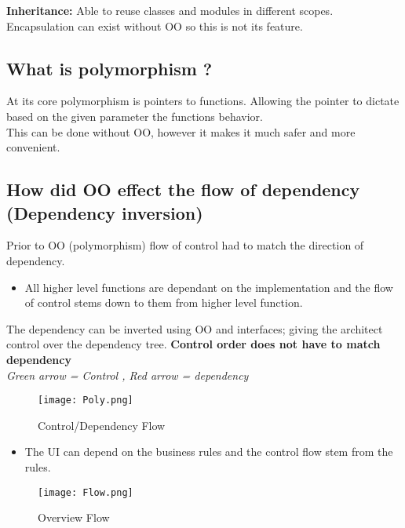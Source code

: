 \documentclass[11pt]{scrartcl} %
\begin{document}
\textbf{Inheritance:} Able to reuse classes and modules in different
scopes.\\

Encapsulation can exist without OO so this is not its feature.

\subsection{What is polymorphism ?}

At its core polymorphism is pointers to functions. Allowing the pointer
to dictate based on the given parameter the functions behavior.\\

This can be done without OO, however it makes it much safer and more
convenient.

\subsection{How did OO effect the flow of dependency (Dependency
inversion)}

Prior to OO (polymorphism) flow of control had to match the direction of dependency.

\begin{itemize}
\item
  All higher level functions are dependant on the implementation and the flow of
  control stems down to them from higher level function.
\end{itemize}

The dependency can be inverted using OO and interfaces; giving the
architect control over the dependency tree. \textbf{Control order does
not have to match dependency}\\

\emph{Green arrow = Control , Red arrow = dependency}

\begin{figure}[h] %
	\centering
	\texttt{[image: Poly.png]} %
	\caption{Control/Dependency Flow}
\end{figure}

\begin{itemize}
\item
  The UI can depend on the business rules and the control flow stem from
  the rules.
\end{itemize}

\begin{figure}[h] %
	\centering
	\texttt{[image: Flow.png]} %
	\caption{Overview Flow}
\end{figure}
\end{document}
